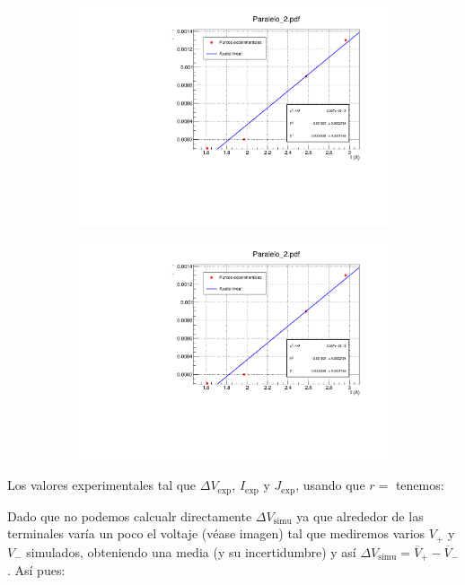 \documentclass[11pt]{article}
\newcommand{\simu}{\text{simu}}
\begin{document}
\begin{figure}[h!]\centering
\begin{subfigure}[b]{0.49\textwidth}
	\includegraphics[width=1.05\linewidth]{Programas/Paralelo_2.pdf}
\end{subfigure} \hfill
\begin{subfigure}[b]{0.49\textwidth}
	\includegraphics[width=1.05\linewidth]{Programas/Paralelo_2.pdf}
\end{subfigure}
\end{figure}


Los valores experimentales tal que $\Delta V_{\exp}$, $I_{\exp}$ y $J_{\exp}$, usando que $r=$ tenemos: 



Dado que no podemos calcualr directamente $\Delta V_{\simu}$ ya que alrededor de las terminales varía un poco el voltaje (véase imagen) tal que mediremos varios $V_+$ y $V_-$ simulados, obteniendo una media (y su incertidumbre) y así $\Delta V_{\simu} = \overline{V}_+ - \overline{V}_{-} $. Así pues: \\[1em]
\end{document}

